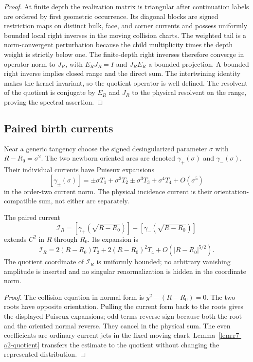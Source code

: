 \begin{proof}
At finite depth the realization matrix is triangular after continuation labels
are ordered by first geometric occurrence.  Its diagonal blocks are signed
restriction maps on distinct bulk, face, and corner currents and possess
uniformly bounded local right inverses in the moving collision charts.  The
weighted tail is a norm-convergent perturbation because the child multiplicity
times the depth weight is strictly below one.  The finite-depth right inverses
therefore converge in operator norm to $J_R$, with
$E_RJ_R=I$ and $J_RE_R$ a bounded projection.  A bounded right inverse implies
closed range and the direct sum.  The intertwining identity makes the kernel
invariant, so the quotient operator is well defined.  The resolvent of the
quotient is conjugate by $E_R$ and $J_R$ to the physical resolvent on the
range, proving the spectral assertion.
\end{proof}

\subsection{Paired birth currents}

Near a generic tangency choose the signed desingularized parameter
$\sigma$ with $R-R_0=\sigma^2$.  The two newborn oriented arcs are denoted
$\gamma_+(\sigma)$ and $\gamma_-(\sigma)$.  Their individual currents have
Puiseux expansions
\[
 [\gamma_\pm(\sigma)]
 =\pm\sigma T_1+\sigma^2T_2\pm\sigma^3T_3+\sigma^4T_4+O(\sigma^5)
\]
in the order-two current norm.  The physical incidence current is their
orientation-compatible sum, not either arc separately.

\begin{lemma}
\label{lem:r7-a2-birth}
The paired current
\[
 \mathcal I_R=[\gamma_+(\sqrt{R-R_0})]
             +[\gamma_-(\sqrt{R-R_0})]
\]
extends $C^2$ in $R$ through $R_0$.  Its expansion is
\[
 \mathcal I_R=2(R-R_0)T_2+2(R-R_0)^2T_4
 +O(|R-R_0|^{5/2}).
\]
The quotient coordinate of $\mathcal I_R$ is uniformly bounded; no arbitrary
vanishing amplitude is inserted and no singular renormalization is hidden in
the coordinate norm.
\end{lemma}

\begin{proof}
The collision equation in normal form is
$y^2-(R-R_0)=0$.  The two roots have opposite orientation.  Pulling the
current form back to the roots gives the displayed Puiseux expansions; odd
terms reverse sign because both the root and the oriented normal reverse.
They cancel in the physical sum.  The even coefficients are ordinary current
jets in the fixed moving chart.  Lemma~\ref{lem:r7-a2-quotient} transfers the
estimate to the quotient without changing the represented distribution.
\end{proof}

